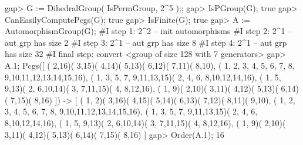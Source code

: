 \beginexample 
gap> G := DihedralGroup( IsPermGroup, 2^5 );;
gap> IsPGroup(G);
true
gap> CanEasilyComputePcgs(G);
true
gap> IsFinite(G);
true
gap> A := AutomorphismGroup(G);
#I  step 1: 2^2 -- init automorphisms 
#I  step 2: 2^1 -- aut grp has size 2
#I  step 3: 2^1 -- aut grp has size 8
#I  step 4: 2^1 -- aut grp has size 32
#I  final step: convert
<group of size 128 with 7 generators>
gap> A.1;
Pcgs([ ( 2,16)( 3,15)( 4,14)( 5,13)( 6,12)( 7,11)( 8,10), 
  ( 1, 2, 3, 4, 5, 6, 7, 8, 9,10,11,12,13,14,15,16), 
  ( 1, 3, 5, 7, 9,11,13,15)( 2, 4, 6, 8,10,12,14,16), 
  ( 1, 5, 9,13)( 2, 6,10,14)( 3, 7,11,15)( 4, 8,12,16), 
  ( 1, 9)( 2,10)( 3,11)( 4,12)( 5,13)( 6,14)( 7,15)( 8,16) ]) -> 
[ ( 1, 2)( 3,16)( 4,15)( 5,14)( 6,13)( 7,12)( 8,11)( 9,10), 
  ( 1, 2, 3, 4, 5, 6, 7, 8, 9,10,11,12,13,14,15,16), 
  ( 1, 3, 5, 7, 9,11,13,15)( 2, 4, 6, 8,10,12,14,16), 
  ( 1, 5, 9,13)( 2, 6,10,14)( 3, 7,11,15)( 4, 8,12,16), 
  ( 1, 9)( 2,10)( 3,11)( 4,12)( 5,13)( 6,14)( 7,15)( 8,16) ]
gap> Order(A.1);
16
\endexample

